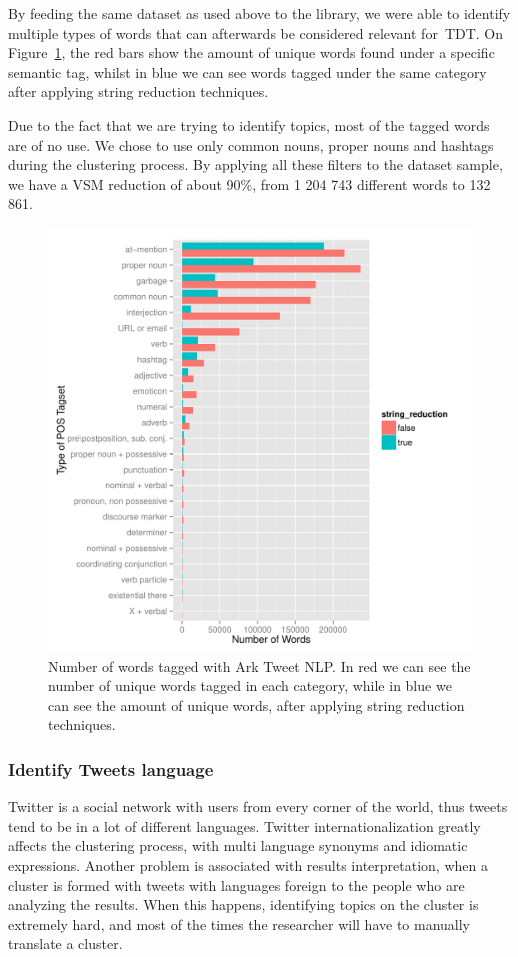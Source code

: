 By feeding the same dataset as used above to the library, we were able to identify multiple types of words that can afterwards be considered relevant for~\ac{TDT}. On Figure~\ref{fig:wordcount_nlp}, the red bars show the amount of unique words found under a specific semantic tag, whilst in blue we can see words tagged under the same category after applying string reduction techniques.

Due to the fact that we are trying to identify topics, most of the tagged words are of no use. We chose to use only common nouns, proper nouns and hashtags during the clustering process. By applying all these filters to the dataset sample, we have a \ac{VSM} reduction of about 90\%, from 1 204 743 different words to 132 861.

\begin{figure}[htpb]
  \centering
  \includegraphics[width=0.8\linewidth]{./plots/svm/plot_wordcount_nlp.pdf}
  \caption{Number of words tagged with Ark Tweet NLP. In red we can see the number of unique words tagged in each category, while in blue we can see the amount of unique words, after applying string reduction techniques.}
  \label{fig:wordcount_nlp}
\end{figure}

\subsubsection{Identify Tweets language}
\label{ssub:identify_tweets_lang}
Twitter is a social network with users from every corner of the world, thus tweets tend to be in a lot of different languages. Twitter internationalization greatly affects the clustering process, with multi language synonyms and idiomatic expressions. Another problem is associated with results interpretation, when a cluster is formed with tweets with languages foreign to the people who are analyzing the results. When this happens, identifying topics on the cluster is extremely hard, and most of the times the researcher will have to manually translate a cluster.  

